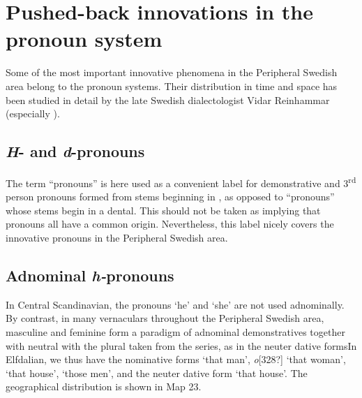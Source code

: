 \section{Pushed-back innovations in the pronoun system}

Some of the most important innovative phenomena in the Peripheral Swedish area belong to the pronoun systems. Their distribution in time and space has been studied in detail by the late Swedish dialectologist Vidar Reinhammar (especially \citet{Reinhammar1975}). 


\subsection{\textit{H}{}- and \textit{d}-pronouns}

The term “pronouns” is here used as a convenient label for demonstrative and 3\textsuperscript{rd} person pronouns formed from stems beginning in , as opposed to “pronouns” whose stems begin in a dental. This should not be taken as implying that pronouns all have a common origin. Nevertheless, this label nicely covers the innovative pronouns in the Peripheral Swedish area.


\subsection{Adnominal \textit{h-}pronouns}

In Central Scandinavian, the pronouns  ‘he’ and  ‘she’ are not used adnominally. By contrast, in many vernaculars throughout the Peripheral Swedish area, masculine  and feminine  form a paradigm of adnominal demonstratives together with neutral with the plural taken from the series, as in the neuter dative formsIn Elfdalian, we thus have the nominative forms  ‘that man’, \textit{o}[328?] ‘that woman’,  ‘that house’,  ‘those men’, and the neuter dative form ‘that house’. The geographical distribution is shown in Map 23. 

